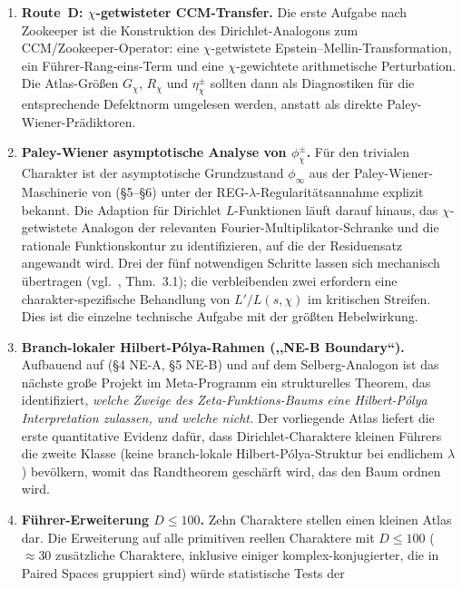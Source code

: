 \documentclass[a4paper,10pt,twocolumn]{article}
\theoremstyle{definition}
\theoremstyle{remark}
\newcommand{\chifn}{\chi}
\begin{document}
\begin{enumerate}
  \item \textbf{Route~D: $\chifn$-getwisteter CCM-Transfer.}
    Die erste Aufgabe nach Zookeeper ist die Konstruktion des Dirichlet-Analogons
    zum CCM/Zookeeper-Operator: eine $\chifn$-getwistete
    Epstein--Mellin-Transformation, ein Führer-Rang-eins-Term und eine
    $\chifn$-gewichtete arithmetische Perturbation. Die Atlas-Größen
    $G_{\chifn}$, $R_{\chifn}$ und $\eta^\pm_{\chifn}$ sollten dann
    als Diagnostiken für die entsprechende Defektnorm umgelesen werden,
    anstatt als direkte Paley-Wiener-Prädiktoren.
  \item \textbf{Paley-Wiener asymptotische Analyse von
    $\phi^\pm_{\chifn}$.}
    Für den trivialen Charakter ist der asymptotische Grundzustand
    $\phi_\infty$ aus der Paley-Wiener-Maschinerie von \cite{RH_II} (\S5--\S6)
    unter der REG-$\lambda$-Regularitätsannahme explizit bekannt.
    Die Adaption für Dirichlet $L$-Funktionen läuft darauf hinaus, das
    $\chifn$-getwistete Analogon der relevanten Fourier-Multiplikator-Schranke
    und die rationale Funktionskontur zu identifizieren, auf die der
    Residuensatz angewandt wird. Drei der fünf notwendigen Schritte
    lassen sich mechanisch übertragen (vgl.\ \cite{AnalyticGroundstate},
    Thm.~3.1); die verbleibenden zwei erfordern eine charakter-spezifische
    Behandlung von $L'/L(s,\chifn)$ im kritischen Streifen. Dies ist
    die einzelne technische Aufgabe mit der größten Hebelwirkung.
  \item \textbf{Branch-lokaler Hilbert-P\'olya-Rahmen (,,NE-B
    Boundary``).}
    Aufbauend auf \cite{RH_II} (\S4 NE-A, \S5 NE-B) und auf dem
    Selberg-Analogon \cite{Selberg1956} ist das nächste große Projekt im Meta-Programm
    ein strukturelles Theorem, das identifiziert, \emph{welche Zweige des
    Zeta-Funktions-Baums eine Hilbert-P\'olya Interpretation zulassen,
    und welche nicht.} Der vorliegende Atlas liefert die erste
    quantitative Evidenz dafür, dass Dirichlet-Charaktere kleinen Führers
    die zweite Klasse (keine branch-lokale Hilbert-P\'olya-Struktur
    bei endlichem $\lambda$) bevölkern, womit das Randtheorem
    geschärft wird, das den Baum ordnen wird.
  \item \textbf{Führer-Erweiterung $D\leq 100$.}
    Zehn Charaktere stellen einen kleinen Atlas dar. Die Erweiterung auf alle primitiven
    reellen Charaktere mit $D\leq 100$ ($\approx 30$ zusätzliche
    Charaktere, inklusive einiger komplex-konjugierter, die in Paired Spaces
    gruppiert sind) würde statistische Tests der

\end{enumerate}
\end{document}
